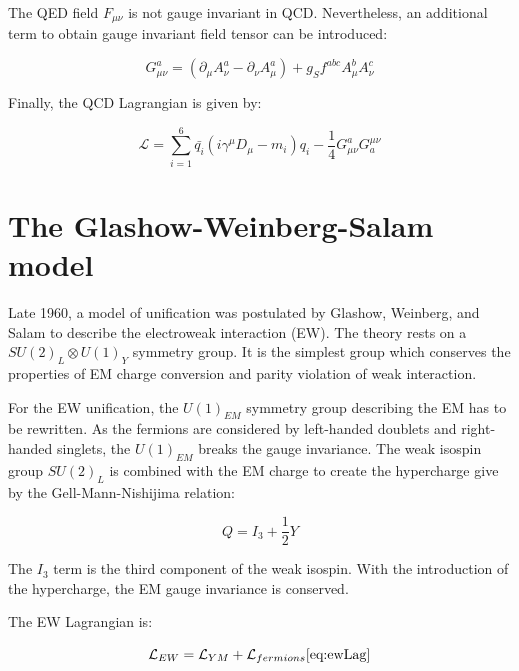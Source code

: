     The QED field $F_{\mu \nu}$ is not gauge invariant in QCD.
    Nevertheless, an additional term to obtain gauge invariant field tensor can be introduced:
    
    \begin{equation}
      G^a_{\mu \nu} = \left( \partial_{\mu} A^a_{\nu} - \partial_{\nu} A^a_{\mu} \right) + g_S f^{abc} A^b_{\mu} A^c_{\nu}
    \end{equation} 

    Finally, the QCD Lagrangian is given by:

    \begin{equation}
      \mathcal{L} = \sum_{i=1}^6  \bar{q_i} \left(i \gamma^{\mu}D_{\mu} -m_i \right)q_i - \frac{1}{4} G_{\mu \nu}^{a} G_{a}^{\mu \nu}
    \end{equation}
    

    \section{The Glashow-Weinberg-Salam model}

    Late 1960, a model of unification was postulated by Glashow, Weinberg, and Salam to describe the electroweak interaction (EW).
    The theory rests on a  $SU(2)_L \otimes U(1)_Y$ symmetry group.
    It is the simplest group which conserves the properties of EM charge conversion and parity violation of weak interaction.

    For the EW unification, the $U(1)_{EM}$ symmetry group describing the EM has to be rewritten.
    As the fermions are considered by left-handed doublets and right-handed singlets, the $U(1)_{EM}$ breaks the gauge invariance.
    The weak isospin group $SU(2)_L$ is combined with the EM charge to create the hypercharge give by the Gell-Mann-Nishijima relation: 
  
    \begin{equation}
      Q = I_3 + \frac{1}{2}Y
    \end{equation}
   
    The $I_3$ term is the third component of the weak isospin.
    With the introduction of the hypercharge, the EM gauge invariance is conserved.

    The EW Lagrangian is:

    \begin{equation}
      \mathcal{L}_{EW} = \mathcal{L}_{YM} + \mathcal{L}_{fermions}
      \ref{eq:ewLag}
    \end{equation}

